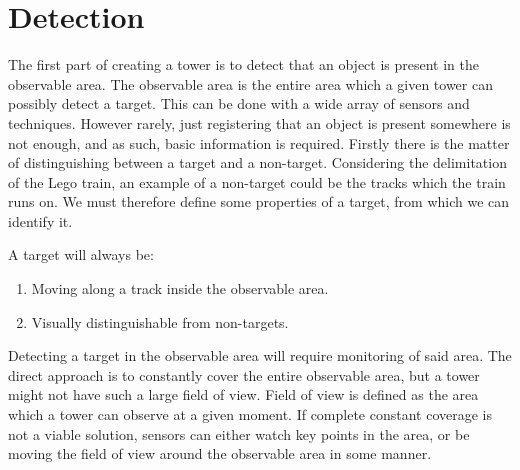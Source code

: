 \section{Detection}\label{sec:registering}

The first part of creating a tower is to detect that an object is present in the observable area. The observable area is the entire area which a given tower can possibly detect a target. This can be done with a wide array of sensors and techniques. However rarely, just registering that an object is present somewhere is not enough, and as such, basic information is required. Firstly there is the matter of distinguishing between a target and a non-target. Considering the delimitation of the Lego train, an example of a non-target could be the tracks which the train runs on. We must therefore define some properties of a target, from which we can identify it.

A target will always be:

\begin{enumerate}
\item Moving along a track inside the observable area.
\item Visually distinguishable from non-targets. 
\end{enumerate}

Detecting a target in the observable area will require monitoring of said area. The direct approach is to constantly cover the entire observable area, but a tower might not have such a large field of view. Field of view is defined as the area which a tower can observe at a given moment. If complete constant coverage is not a viable solution, sensors can either watch key points in the area, or be moving the field of view around the observable area in some manner.